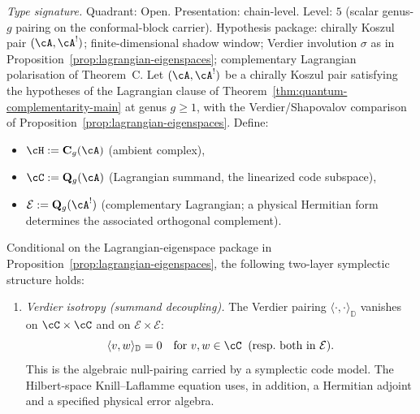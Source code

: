 \begin{proposition}
\label{prop:hc-knill-laflamme}
\textit{Type signature.} Quadrant: Open. Presentation: chain-level.
Level: $5$ (scalar genus-$g$ pairing on the conformal-block carrier).
Hypothesis package: chirally Koszul pair $(\cA, \cA^!)$;
finite-dimensional shadow window; Verdier involution $\sigma$ as in
Proposition~\textup{\ref{prop:lagrangian-eigenspaces}}; complementary
Lagrangian polarisation of Theorem~C.
\smallskip\noindent
Let $(\cA, \cA^!)$ be a chirally Koszul pair satisfying the
hypotheses of the Lagrangian clause of
Theorem~\textup{\ref{thm:quantum-complementarity-main}} at genus
$g\geq1$, with the Verdier/Shapovalov comparison of
Proposition~\textup{\ref{prop:lagrangian-eigenspaces}}.
Define:
\begin{itemize}
\item $\cH := \mathbf{C}_g(\cA)$ \quad
 \textup{(}ambient complex\textup{)},
\item $\cC := \mathbf{Q}_g(\cA)$ \quad
 \textup{(}Lagrangian summand, the linearized code subspace\textup{)},
\item $\mathcal E := \mathbf{Q}_g(\cA^!)$ \quad
 \textup{(}complementary Lagrangian; a physical Hermitian form
 determines the associated orthogonal complement\textup{)}.
\end{itemize}
Conditional on the Lagrangian-eigenspace package in
Proposition~\textup{\ref{prop:lagrangian-eigenspaces}}, the following
two-layer symplectic structure holds:

\begin{enumerate}[label=\textup{(\roman*)}]
\item \emph{Verdier isotropy \textup{(}summand decoupling\textup{)}.}
 The Verdier pairing $\langle \cdot, \cdot \rangle_{\mathbb{D}}$
 vanishes on $\cC \times \cC$ and on
 $\mathcal E \times \mathcal E$:
 \begin{equation}\label{eq:hc-verdier-isotropy}
 \langle v, w \rangle_{\mathbb{D}} = 0
 \quad\text{for } v, w \in \cC
 \;\;\text{(resp.\ both in } \mathcal E\text{)}.
 \end{equation}
 This is the algebraic null-pairing carried by a symplectic code
 model.  The Hilbert-space Knill--Laflamme equation uses, in addition,
 a Hermitian adjoint and a specified physical error algebra.


\end{enumerate}
\end{proposition}
